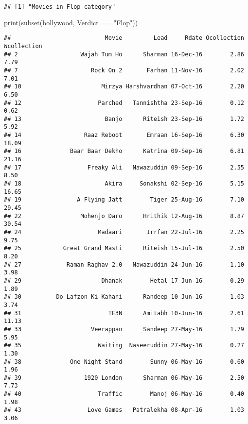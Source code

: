\documentclass[
]{article}
\newenvironment{Shaded}{\begin{snugshade}}{\end{snugshade}}
\newcommand{\FunctionTok}[1]{\textcolor[rgb]{0.00,0.00,0.00}{#1}}
\newcommand{\NormalTok}[1]{#1}
\newcommand{\SpecialCharTok}[1]{\textcolor[rgb]{0.00,0.00,0.00}{#1}}
\newcommand{\StringTok}[1]{\textcolor[rgb]{0.31,0.60,0.02}{#1}}
\begin{document}
\begin{verbatim}
## [1] "Movies in Flop category"
\end{verbatim}

\begin{Shaded}
\begin{Highlighting}[]
\FunctionTok{print}\NormalTok{(}\FunctionTok{subset}\NormalTok{(bollywood, Verdict }\SpecialCharTok{==} \StringTok{"Flop"}\NormalTok{))}
\end{Highlighting}
\end{Shaded}

\begin{verbatim}
##                           Movie         Lead     Rdate Ocollection Wcollection
## 2                  Wajah Tum Ho      Sharman 16-Dec-16        2.86        7.79
## 7                     Rock On 2       Farhan 11-Nov-16        2.02        7.01
## 10                       Mirzya Harshvardhan 07-Oct-16        2.20        6.50
## 12                      Parched   Tannishtha 23-Sep-16        0.12        0.62
## 13                        Banjo      Riteish 23-Sep-16        1.72        5.92
## 14                  Raaz Reboot       Emraan 16-Sep-16        6.30       18.09
## 16              Baar Baar Dekho      Katrina 09-Sep-16        6.81       21.16
## 17                   Freaky Ali   Nawazuddin 09-Sep-16        2.55        8.50
## 18                        Akira     Sonakshi 02-Sep-16        5.15       16.65
## 19                A Flying Jatt        Tiger 25-Aug-16        7.10       29.45
## 22                 Mohenjo Daro      Hrithik 12-Aug-16        8.87       30.54
## 24                      Madaari       Irrfan 22-Jul-16        2.25        9.75
## 25            Great Grand Masti      Riteish 15-Jul-16        2.50        8.20
## 27             Raman Raghav 2.0   Nawazuddin 24-Jun-16        1.10        3.98
## 29                       Dhanak        Hetal 17-Jun-16        0.29        1.89
## 30          Do Lafzon Ki Kahani      Randeep 10-Jun-16        1.03        3.74
## 31                         TE3N      Amitabh 10-Jun-16        2.61       11.13
## 33                    Veerappan      Sandeep 27-May-16        1.79        5.95
## 35                      Waiting  Naseeruddin 27-May-16        0.27        1.30
## 38              One Night Stand        Sunny 06-May-16        0.60        1.96
## 39                  1920 London      Sharman 06-May-16        2.50        7.73
## 40                      Traffic        Manoj 06-May-16        0.40        1.98
## 43                   Love Games   Patralekha 08-Apr-16        1.03        3.06

\end{verbatim}
\end{document}
